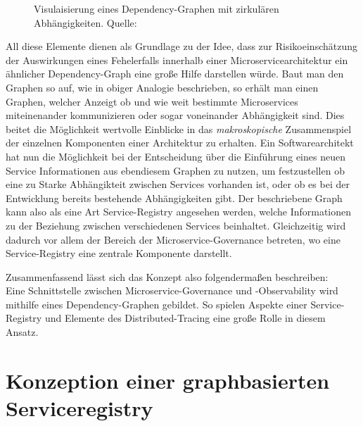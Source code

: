 \documentclass[
	12pt,
	BCOR=5mm,
	DIV=12,
	headinclude=on,
	footinclude=off,
	parskip=half,
	bibliography=totoc,
	listof=entryprefix,
	toc=listof,
	numbers=noenddot,
	plainfootsepline
]{scrreprt}
\begin{document}
\begin{figure}[h]
	\centering
	\caption[Dependency Graph]{Visulaisierung eines Dependency-Graphen mit zirkulären Abhängigkeiten. Quelle: \cite[]{GraphViz}}
	\label{fig:GraphViz}
\end{figure}
 All diese Elemente dienen als Grundlage zu der Idee, dass zur Risikoeinschätzung der Auswirkungen eines Fehelerfalls innerhalb einer Microservicearchitektur ein ähnlicher Dependency-Graph eine große Hilfe darstellen würde. Baut man den Graphen so auf, wie in obiger Analogie beschrieben, so erhält man einen Graphen, welcher Anzeigt ob und wie weit bestimmte Microservices miteinenander kommunizieren oder sogar voneinander Abhängigkeit sind. Dies beitet die Möglichkeit wertvolle Einblicke in das \textit{makroskopische} Zusammenspiel der einzelnen Komponenten einer Architektur zu erhalten. Ein Softwarearchitekt hat nun die Möglichkeit bei der Entscheidung über die Einführung eines neuen Service Informationen aus ebendiesem Graphen zu nutzen, um festzustellen ob eine zu Starke Abhängikteit zwischen Services vorhanden ist, oder ob es bei der Entwicklung bereits bestehende Abhängigkeiten gibt.
Der beschriebene Graph kann also als eine Art Service-Registry angesehen werden, welche Informationen zu der Beziehung zwischen verschiedenen Services beinhaltet. Gleichzeitig wird dadurch vor allem der Bereich der Microservice-Governance betreten, wo eine Service-Registry eine zentrale Komponente darstellt. 

Zusammenfassend lässt sich das Konzept also folgendermaßen beschreiben: \\
Eine Schnittstelle zwischen Microservice-Governance und -Observability wird mithilfe eines Dependency-Graphen gebildet. So spielen Aspekte einer Service-Registry und Elemente des Distributed-Tracing eine große Rolle in diesem Ansatz.

\chapter{Konzeption einer graphbasierten Serviceregistry}
\end{document}
